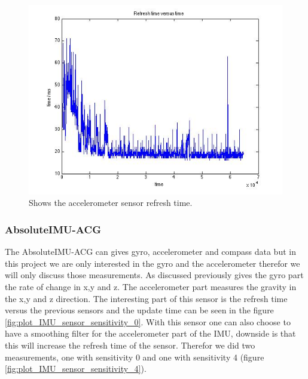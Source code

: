 \documentclass[a4paper]{article}
\begin{document}
	\begin{figure}[h]
		\centering
		\includegraphics[width=1.3\textwidth]{plot_acce_refresh_time_20150107}
		\caption{Shows the accelerometer sensor refresh time.}
		\label{fig:plot_acce_refresh_time}
	\end{figure}
	
	
         
        
        
        \subsubsection{AbsoluteIMU-ACG}
        The AbsoluteIMU-ACG can gives gyro, accelerometer and compass data but in this project we are only interested in the gyro and the accelerometer therefor we will only discuss those measurements. As discussed previously gives the gyro part the rate of change in x,y and z. The accelerometer part measures the gravity in the x,y and z direction. The interesting part of this sensor is the refresh time versus the previous sensors and the update time can be seen in the figure \ref{fig:plot_IMU_sensor_sensitivity_0}. With this sensor one can also choose to have a smoothing filter for the accelerometer part of the IMU, downside is that this will increase the refresh time of the sensor. Therefor we did two measurements, one with sensitivity 0 and one with sensitivity 4 (figure \ref{fig:plot_IMU_sensor_sensitivity_4}). 
        
\end{document}
